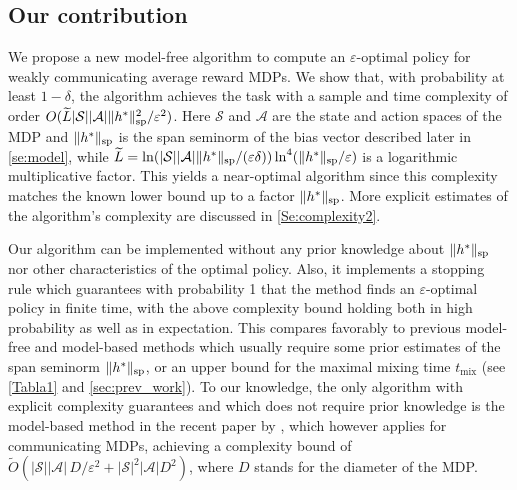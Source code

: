 \documentclass{article}
\newcommand{\cA}{\mathcal{A}}
\newcommand{\cS}{\mathcal{S}}
\renewcommand{\sp}[1]{\|{#1}\|_\text{\rm sp}}
\theoremstyle{plain}
\theoremstyle{definition}
\theoremstyle{remark}
\begin{document}
\subsection{Our contribution} We propose a new model-free algorithm to compute an $\varepsilon$-optimal policy for weakly communicating average reward MDPs. We show that, with probability at least $1-\delta$, the algorithm achieves the task with a sample and time complexity of order ${O}(\widetilde{L}|\cS||\cA|\sp{h^*}^{2}/\varepsilon^{2})$. Here
 $\cS$ and $\cA$ are the state and action spaces of the MDP and $\sp{h^*}$ is the span seminorm of the bias vector described later in \cref{se:model}, while $\widetilde{L}= \ln (|\cS||\cA|\sp{h^*}/(\varepsilon \delta))\ln^4 (\sp{h^*}/\varepsilon)$
 is a logarithmic multiplicative factor. 
This yields a near-optimal algorithm since this complexity matches the known lower bound up to a factor $\sp{h^*}$. More explicit estimates of the algorithm's complexity are discussed in \cref{Se:complexity2}.


 Our algorithm can be implemented without any prior knowledge about $\sp{h^*}$ nor other characteristics of the optimal policy. Also, it implements a stopping rule which guarantees with probability 1 that the method finds an $\varepsilon$-optimal policy in finite time, with the above complexity bound holding both in high probability as well as in expectation. 
This compares favorably to previous model-free and model-based methods
     which usually require some prior estimates of the span seminorm $\sp{h^*}$, or an upper bound for the maximal mixing time $t_{\text{mix}}$ (see \cref{Tabla1} and \cref{sec:prev_work}). 
    To our knowledge, the  only  algorithm with explicit complexity guarantees and which does not require prior knowledge is the model-based method  in the recent paper by \citet{tuynman2024finding}, which however applies for communicating MDPs, achieving a complexity bound of $\widetilde{O}(|\cS||\cA|\,D/\varepsilon^{2} + |\cS|^2|\cA|D^2)$, where $D$ stands for the diameter of the MDP.
\end{document}
